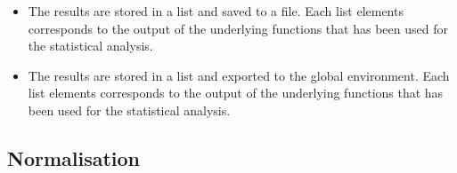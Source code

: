 \documentclass[a4paper,11pt]{article}
\begin{document}
\begin{itemize}
\item {}  The results are stored in a list and saved to a file. Each list elements corresponds to
the output of the underlying functions that has been used for the statistical analysis.  

\item {}  The results are stored in a list and exported to the global environment.
 Each list elements corresponds to
the output of the underlying functions that has been used for the statistical analysis.  



\end{itemize}


\subsection{Normalisation}
\end{document}
